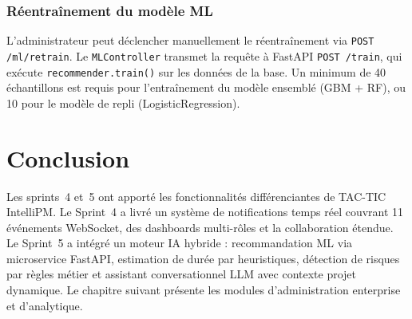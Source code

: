 \subsubsection*{Réentraînement du modèle ML}

L'administrateur peut déclencher manuellement le réentraînement via
\texttt{POST /ml/retrain}. Le \texttt{MLController} transmet la requête
à FastAPI \texttt{POST /train}, qui exécute \texttt{recommender.train()} sur les
données de la base. Un minimum de 40 échantillons est requis pour l'entraînement
du modèle ensemblé (GBM + RF), ou 10 pour le modèle de repli (LogisticRegression).

\section{Conclusion}

\begin{chapconclusion}
Les sprints~4 et~5 ont apporté les fonctionnalités différenciantes de TAC-TIC
IntelliPM. Le Sprint~4 a livré un système de notifications temps réel couvrant
11 événements WebSocket, des dashboards multi-rôles et la collaboration étendue.
Le Sprint~5 a intégré un moteur IA hybride : recommandation ML via microservice
FastAPI, estimation de durée par heuristiques, détection de risques par règles
métier et assistant conversationnel LLM avec contexte projet dynamique. Le chapitre
suivant présente les modules d'administration enterprise et d'analytique.
\end{chapconclusion}
